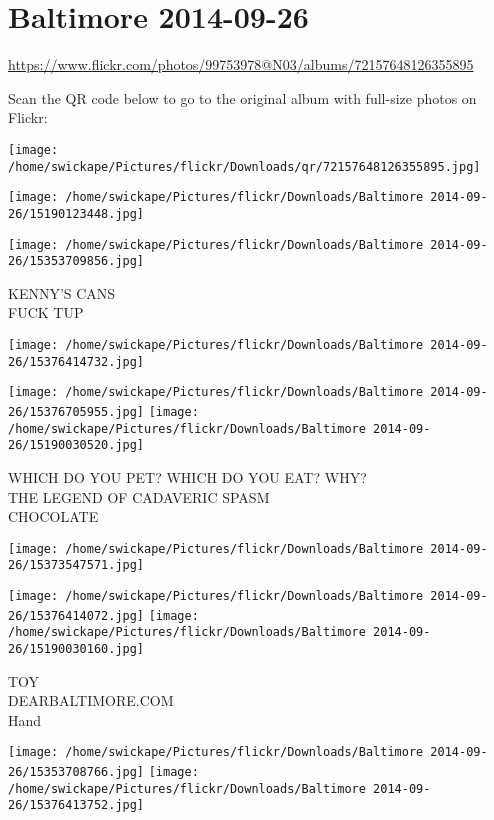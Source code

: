 \documentclass[10pt,letterpaper]{article}
\title{}
\author{}
\date{}
\begin{document}
\section*{Baltimore 2014-09-26}

\url{https://www.flickr.com/photos/99753978@N03/albums/72157648126355895}

Scan the QR code below to go to the original album with full-size photos on Flickr:

\texttt{[image: /home/swickape/Pictures/flickr/Downloads/qr/72157648126355895.jpg]}
\pagebreak

\texttt{[image: /home/swickape/Pictures/flickr/Downloads/Baltimore 2014-09-26/15190123448.jpg]}

\vspace{0.25in}
\texttt{[image: /home/swickape/Pictures/flickr/Downloads/Baltimore 2014-09-26/15353709856.jpg]}

KENNY'S CANS\\
FUCK TUP
\pagebreak

\texttt{[image: /home/swickape/Pictures/flickr/Downloads/Baltimore 2014-09-26/15376414732.jpg]}

\vspace{0.25in}
\texttt{[image: /home/swickape/Pictures/flickr/Downloads/Baltimore 2014-09-26/15376705955.jpg]}
\texttt{[image: /home/swickape/Pictures/flickr/Downloads/Baltimore 2014-09-26/15190030520.jpg]}

WHICH DO YOU PET?  WHICH DO YOU EAT?  WHY?\\
THE LEGEND OF CADAVERIC SPASM\\
CHOCOLATE
\pagebreak

\texttt{[image: /home/swickape/Pictures/flickr/Downloads/Baltimore 2014-09-26/15373547571.jpg]}

\vspace{0.25in}
\texttt{[image: /home/swickape/Pictures/flickr/Downloads/Baltimore 2014-09-26/15376414072.jpg]}
\texttt{[image: /home/swickape/Pictures/flickr/Downloads/Baltimore 2014-09-26/15190030160.jpg]}

TOY\\
DEARBALTIMORE.COM\\
Hand
\pagebreak

\texttt{[image: /home/swickape/Pictures/flickr/Downloads/Baltimore 2014-09-26/15353708766.jpg]}
\texttt{[image: /home/swickape/Pictures/flickr/Downloads/Baltimore 2014-09-26/15376413752.jpg]}
\end{document}
